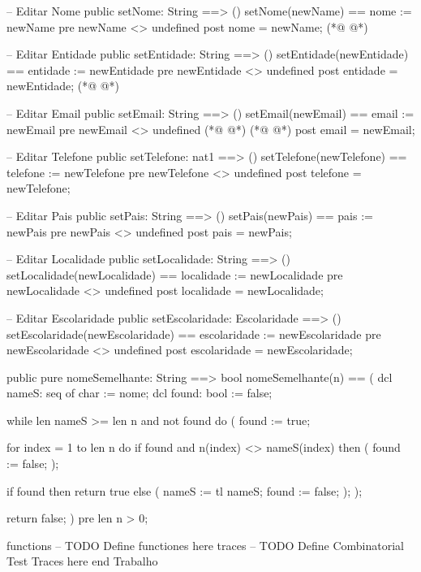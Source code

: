 \begin{vdmpp}[breaklines=true]
 -- Editar Nome
 public setNome: String ==> ()
 setNome(newName) == nome := newName
 pre newName <> undefined
 post nome = newName;
(*@
\label{setLocalidade:161}
@*)
 
 -- Editar Entidade
 public setEntidade: String ==> ()
 setEntidade(newEntidade) == entidade := newEntidade
 pre newEntidade <> undefined
 post entidade = newEntidade;
(*@
\label{setEscolaridade:167}
@*)
 
 -- Editar Email
 public setEmail: String ==> ()
 setEmail(newEmail) == email := newEmail
 pre newEmail <> undefined
(*@
\label{similarName:172}
@*)
(*@
\label{nomeSemelhante:172}
@*)
 post email = newEmail;
 
 -- Editar Telefone
 public setTelefone: nat1 ==> ()
 setTelefone(newTelefone) == telefone := newTelefone
 pre newTelefone <> undefined
 post telefone = newTelefone;

 -- Editar Pais
 public setPais: String ==> ()
 setPais(newPais) == pais := newPais
 pre newPais <> undefined
 post pais = newPais;
 
 -- Editar Localidade
 public setLocalidade: String ==> ()
 setLocalidade(newLocalidade) == localidade := newLocalidade
 pre newLocalidade <> undefined
 post localidade = newLocalidade;
 
 -- Editar Escolaridade
 public setEscolaridade: Escolaridade ==> ()
 setEscolaridade(newEscolaridade) == escolaridade := newEscolaridade
 pre newEscolaridade <> undefined
 post escolaridade = newEscolaridade;
 
 public pure nomeSemelhante: String ==> bool
 nomeSemelhante(n) == (
  dcl nameS: seq of char := nome;
  dcl found: bool := false;
  
  while len nameS >= len n and not found do (
   found := true;
 
   for index = 1 to len n do
    if found and n(index) <> nameS(index) then (
     found := false;
    );
   
   if found then
    return true
   else (
    nameS := tl nameS;
    found := false;
   );
  );
   
  return false;
 )
 pre len n > 0;
  
functions
-- TODO Define functiones here
traces
-- TODO Define Combinatorial Test Traces here
end Trabalho
\end{vdmpp}
\bigskip
